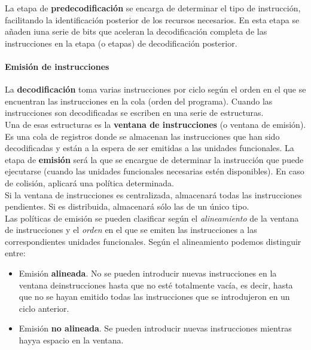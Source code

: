 \documentclass[12pt,spanish]{article}
\begin{document}
La etapa de \textbf{predecodificación} se encarga de determinar el tipo de instrucción, facilitando la identificación posterior de los recursos necesarios. En esta etapa se añaden iuna serie de bits que aceleran la decodificación completa de las instrucciones en la etapa (o etapas) de decodificación posterior.\\

\paragraph{Emisión de instrucciones\\}

La \textbf{decodificación} toma varias instrucciones por ciclo según el orden en el que se encuentran las instrucciones en la cola (orden del programa). Cuando las instrucciones son decodificadas se escriben en una serie de estructuras.\\

Una de esas estructuras es la \textbf{ventana de instrucciones} (o ventana de emisión). Es una cola de registros donde se almacenan las instrucciones que han sido decodificadas y están a la espera de ser emitidas a las unidades funcionales. La etapa de \textbf{emisión} será la que se encargue de determinar la instrucción que puede ejecutarse (cuando las unidades funcionales necesarias estén disponibles). En caso de colisión, aplicará una política determinada.\\

Si la ventana de instrucciones es centralizada, almacenará todas las instrucciones pendientes. Si es distribuida, almacenará sólo las de un único tipo.\\

Las políticas de emisión se pueden clasificar según el \emph{alineamiento} de la ventana de instrucciones y el \emph{orden} en el que se emiten las instrucciones a las correspondientes unidades funcionales. Según el alineamiento podemos distinguir entre:

\begin{itemize}
	\item Emisión \textbf{alineada}. No se pueden introducir nuevas instrucciones en la ventana deinstrucciones hasta que no esté totalmente vacía, es decir, hasta que no se hayan emitido todas las instrucciones que se introdujeron en un ciclo anterior.
	\item Emisión \textbf{no alineada}. Se pueden introducir nuevas instrucciones mientras hayya espacio en la ventana.
\end{itemize}
\end{document}

